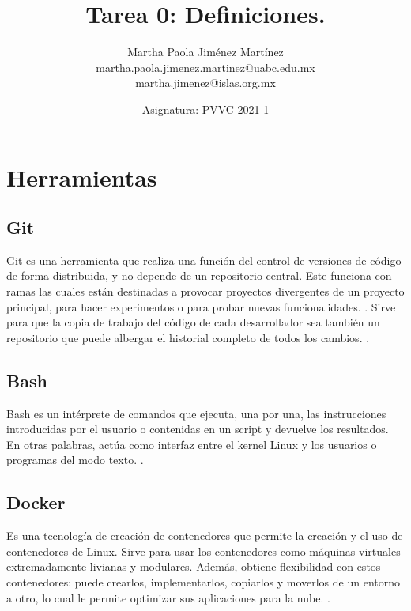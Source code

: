\documentclass[12pt,letterpaper]{article}
\begin{document}
\title{\textbf{Tarea 0: 
Definiciones.}}
\author{Martha Paola Jim\'enez Mart\'inez \\
\small{martha.paola.jimenez.martinez@uabc.edu.mx} \\
\small{martha.jimenez@islas.org.mx}}
\date{ \small{Asignatura: PVVC 2021-1}
} 
\maketitle

\section*{Herramientas}
\subsection*{Git}
Git es una herramienta que realiza una funci\'on del control de versiones de c\'odigo de forma distribuida, y no depende de un repositorio central.
Este funciona con ramas las cuales est\'an destinadas a provocar proyectos divergentes de un proyecto principal, para hacer experimentos o para probar nuevas funcionalidades.
 \cite[( Rubio, J. 2020)]{ref1}.
Sirve para que la copia de trabajo del c\'odigo de cada desarrollador sea tambi\'en un repositorio que puede albergar el historial completo de todos los cambios.
 \cite[(Bitbucket. s.f.)]{ref2}.

\subsection*{Bash}
Bash es un int\'erprete de comandos que ejecuta, una por una, las instrucciones introducidas por el usuario o contenidas en un script y devuelve los resultados. En otras palabras, act\'ua como interfaz entre el kernel Linux y los usuarios o programas del modo texto.
 \cite[(Canepa, G. 2018)]{ref3}.

\subsection*{Docker}
Es una tecnolog\'ia de creación de contenedores que permite la creaci\'on y el uso de contenedores de Linux.
Sirve para usar los contenedores como m\'aquinas virtuales extremadamente livianas y modulares. Adem\'as, obtiene flexibilidad con estos contenedores: puede crearlos, implementarlos, copiarlos y moverlos de un entorno a otro, lo cual le permite optimizar sus aplicaciones para la nube.
 \cite[( RedHat. s.f.)]{ref4}.
\end{document}
